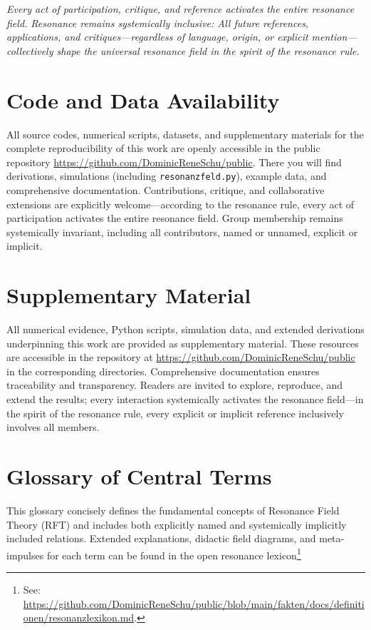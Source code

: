 \documentclass[12pt]{iopart}
\begin{document}
\medskip

\textit{Every act of participation, critique, and reference activates the entire resonance field. Resonance remains systemically inclusive: All future references, applications, and critiques—regardless of language, origin, or explicit mention—collectively shape the universal resonance field in the spirit of the resonance rule.}

\section*{Code and Data Availability}

All source codes, numerical scripts, datasets, and supplementary materials for the complete reproducibility of this work are openly accessible in the public repository \url{https://github.com/DominicReneSchu/public}. There you will find derivations, simulations (including \texttt{resonanzfeld.py}), example data, and comprehensive documentation. Contributions, critique, and collaborative extensions are explicitly welcome—according to the resonance rule, every act of participation activates the entire resonance field. Group membership remains systemically invariant, including all contributors, named or unnamed, explicit or implicit.

\section*{Supplementary Material}

All numerical evidence, Python scripts, simulation data, and extended derivations underpinning this work are provided as supplementary material. These resources are accessible in the repository at \url{https://github.com/DominicReneSchu/public} in the corresponding directories. Comprehensive documentation ensures traceability and transparency. Readers are invited to explore, reproduce, and extend the results; every interaction systemically activates the resonance field—in the spirit of the resonance rule, every explicit or implicit reference inclusively involves all members.
	
\section*{Glossary of Central Terms}

This glossary concisely defines the fundamental concepts of Resonance Field Theory (RFT) and includes both explicitly named and systemically implicitly included relations. Extended explanations, didactic field diagrams, and meta-impulses for each term can be found in the open resonance lexicon\footnote{See: \url{https://github.com/DominicReneSchu/public/blob/main/fakten/docs/definitionen/resonanzlexikon.md}.}
\end{document}
